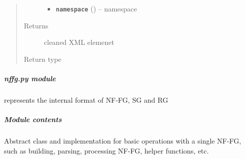 \documentclass[letterpaper,10pt,english]{sphinxmanual}
\begin{document}
\begin{fulllineitems}
\begin{fulllineitems}
\begin{quote}
\begin{description}
\begin{itemize}
\item {} 
\textbf{\texttt{namespace}} () -- namespace

\end{itemize}

\item[{Returns}] \leavevmode
cleaned XML elemenet

\item[{Return type}] \leavevmode
{}

\end{description}\end{quote}

\end{fulllineitems}


\end{fulllineitems}



\subparagraph{\emph{nffg.py} module}
\label{util/nffg::doc}\label{util/nffg:nffg-py-module}
{\hyperref[util/nffg:escape.util.nffg.NFFG]{\emph{}}} represents the internal format of NF-FG, SG and RG


\subparagraph{Module contents}
\label{util/nffg:module-contents}\label{util/nffg:module-escape.util.nffg}
Abstract class and implementation for basic operations with a single
NF-FG, such as building, parsing, processing NF-FG, helper functions,
etc.
\end{document}
